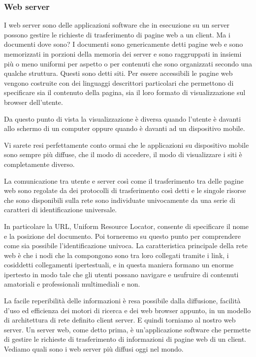      \subsubsection{Web server}
     I web server sono delle applicazioni software che in esecuzione su un server possono gestire le richieste di trasferimento di pagine web a un client. Ma i documenti dove sono? I documenti sono genericamente detti pagine web e sono memorizzati in porzioni della memoria dei server e sono raggruppati in insiemi più o meno uniformi per aspetto o per contenuti che sono organizzati secondo una qualche struttura. Questi sono detti siti. Per essere accessibili le pagine web vengono costruite con dei linguaggi descrittori particolari che permettono di specificare sia il contenuto della pagina, sia il loro formato di visualizzazione sul browser dell'utente.  \par
     Da questo punto di vista la visualizzazione è diversa quando l'utente è davanti allo schermo di un computer oppure quando è davanti ad un dispositivo mobile.\par 
     Vi sarete resi perfettamente conto ormai che le applicazioni su dispositivo mobile sono sempre più diffuse, che il modo di accedere, il modo di visualizzare i siti è completamente diverso.\par
     La comunicazione tra utente e server così come il trasferimento tra delle pagine web sono regolate da dei protocolli di trasferimento così detti e le singole risorse che sono disponibili sulla rete sono individuate univocamente da una serie di caratteri di identificazione universale. \par
     In particolare la URL, Uniform Resource Locator, consente di specificare il nome e la posizione del documento. Poi torneremo su questo punto per comprendere come sia possibile l'identificazione univoca. La caratteristica principale della rete web è che i nodi che la compongono sono tra loro collegati tramite i link, i cosiddetti collegamenti ipertestuali, e in questa maniera formano un enorme ipertesto in modo tale che gli utenti possano navigare e usufruire di contenuti amatoriali e professionali multimediali e non.\par
     La facile reperibilità delle informazioni è resa possibile dalla diffusione, facilità d'uso ed efficienza dei motori di ricerca e dei web browser appunto, in un modello di architettura di rete definito client server. E quindi torniamo al nostro web server. Un server web, come detto prima, è un'applicazione software che permette di gestire le richieste di trasferimento di informazioni di pagine web di un client. Vediamo quali sono i web server più diffusi oggi nel mondo. 
     
